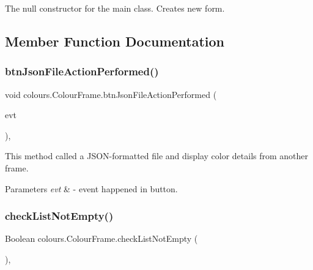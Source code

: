The null constructor for the main class. Creates new form. 

\subsection{Member Function Documentation}
\mbox{\label{classcolours_1_1_colour_frame_ab959355834a40b99a18e05e5121417c5}} 
\subsubsection{\texorpdfstring{btn\+Json\+File\+Action\+Performed()}{btnJsonFileActionPerformed()}}
{\footnotesize\ttfamily void colours.\+Colour\+Frame.\+btn\+Json\+File\+Action\+Performed (\begin{DoxyParamCaption}\item[{java.\+awt.\+event.\+Action\+Event}]{evt }\end{DoxyParamCaption})\hspace{0.3cm}{\ttfamily [inline]}, {\ttfamily [private]}}

This method called a J\+S\+O\+N-\/formatted file and display color details from another frame. 
\begin{DoxyParams}{Parameters}
{\em evt} & -\/ event happened in button. \\
\hline
\end{DoxyParams}
\mbox{\label{classcolours_1_1_colour_frame_a693e820f5c6ea43ce0a862bd751f42c3}} 
\subsubsection{\texorpdfstring{check\+List\+Not\+Empty()}{checkListNotEmpty()}}
{\footnotesize\ttfamily Boolean colours.\+Colour\+Frame.\+check\+List\+Not\+Empty (\begin{DoxyParamCaption}{ }\end{DoxyParamCaption})\hspace{0.3cm}{\ttfamily [inline]}, {\ttfamily [private]}}

